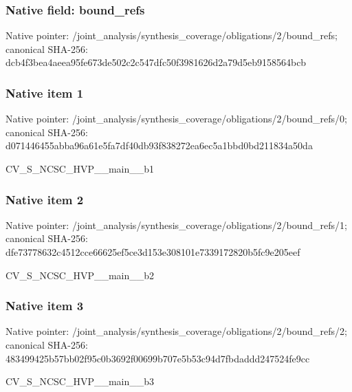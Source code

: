 \documentclass[10pt,a4paper]{article}
\begin{document}
\subsubsection{Native field: bound\_\allowbreak{}refs}
Native pointer: /joint\_\allowbreak{}analysis/synthesis\_\allowbreak{}coverage/obligations/2/bound\_\allowbreak{}refs; canonical SHA-256: dcb4f3bea4aeea95fe673de502c2c547dfc50f3981626d2a79d5eb9158564bcb

\subsubsection{Native item 1}
Native pointer: /joint\_\allowbreak{}analysis/synthesis\_\allowbreak{}coverage/obligations/2/bound\_\allowbreak{}refs/0; canonical SHA-256: d071446455abba96a61e5fa7df40db93f838272ea6ec5a1bbd0bd211834a50da

\begingroup\raggedright\sloppy CV\_\allowbreak{}S\_\allowbreak{}NCSC\_\allowbreak{}HVP\_\allowbreak{}\_\allowbreak{}main\_\allowbreak{}\_\allowbreak{}b1\par\endgroup

\subsubsection{Native item 2}
Native pointer: /joint\_\allowbreak{}analysis/synthesis\_\allowbreak{}coverage/obligations/2/bound\_\allowbreak{}refs/1; canonical SHA-256: dfe73778632c4512cce66625ef5ce3d153e308101e7339172820b5fc9e205eef

\begingroup\raggedright\sloppy CV\_\allowbreak{}S\_\allowbreak{}NCSC\_\allowbreak{}HVP\_\allowbreak{}\_\allowbreak{}main\_\allowbreak{}\_\allowbreak{}b2\par\endgroup

\subsubsection{Native item 3}
Native pointer: /joint\_\allowbreak{}analysis/synthesis\_\allowbreak{}coverage/obligations/2/bound\_\allowbreak{}refs/2; canonical SHA-256: 483499425b57bb02f95c0b3692f00699b707e5b53c94d7fbdaddd247524fe9cc

\begingroup\raggedright\sloppy CV\_\allowbreak{}S\_\allowbreak{}NCSC\_\allowbreak{}HVP\_\allowbreak{}\_\allowbreak{}main\_\allowbreak{}\_\allowbreak{}b3\par\endgroup
\end{document}

